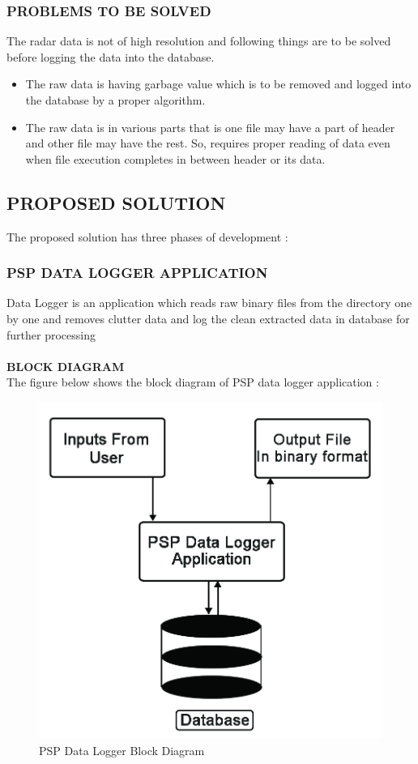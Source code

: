 \documentclass[14pt]{article} %
\begin{document}
\subsubsection{PROBLEMS TO BE SOLVED}
The radar data is not of high resolution and following things are to be solved before logging the data into the database.
\begin{itemize}
\item The raw data is having garbage value which is to be removed and logged into the database by a proper algorithm.
\item The  raw data is in various parts that is one file may have a part of header and other file may have the rest. So,  requires proper reading of data even when file execution completes in between header or its data.
 \end{itemize}

\subsection{PROPOSED SOLUTION }
The proposed solution has three phases of development :
\subsubsection{PSP DATA LOGGER APPLICATION}
Data Logger is an application which reads raw binary files from the directory one by one and removes clutter data and log the clean extracted data in database for further processing\\
\\ \textbf{BLOCK DIAGRAM}
\\ The figure below shows the block diagram of PSP data logger application :

\begin{figure}[H]
    \centerline{\includegraphics[width=\linewidth]{psploggerblockdiagram.jpg}}
  \caption{PSP Data Logger Block Diagram}
  \label{fig:figure 12}
\end{figure}
\end{document}
